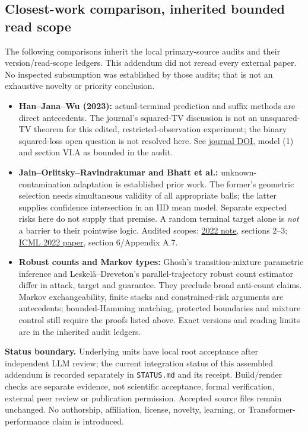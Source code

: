 \documentclass[10pt]{article}
\begin{document}
\subsection*{Closest-work comparison, inherited bounded read scope}
The following comparisons inherit the local primary-source audits and their version/read-scope ledgers. This addendum did not reread every external paper. No inspected subsumption was established by those audits; that is not an exhaustive novelty or priority conclusion.
\begin{itemize}
\item \textbf{Han--Jana--Wu (2023):} actual-terminal prediction and suffix methods are direct antecedents. The journal's squared-TV discussion is not an unsquared-TV theorem for this edited, restricted-observation experiment; the binary squared-loss open question is not resolved here. See \href{https://doi.org/10.1109/TIT.2023.3239508}{journal DOI}, model (1) and section VI.A as bounded in the audit.
\item \textbf{Jain--Orlitsky--Ravindrakumar and Bhatt et al.:} unknown-contamination adaptation is established prior work. The former's geometric selection needs simultaneous validity of all appropriate balls; the latter supplies confidence intersection in an IID mean model. Separate expected risks here do not supply that premise. A random terminal target alone is \emph{not} a barrier to their pointwise logic. Audited scopes: \href{https://arxiv.org/pdf/2202.05453v1}{2022 note}, sections 2--3; \href{https://proceedings.mlr.press/v162/bhatt22a/bhatt22a.pdf}{ICML 2022 paper}, section 6/Appendix A.7.
\item \textbf{Robust counts and Markov types:} Ghosh's transition-mixture parametric inference and Leskel\"a--Dreveton's parallel-trajectory robust count estimator differ in attack, target and guarantee. They preclude broad anti-count claims. Markov exchangeability, finite stacks and constrained-risk arguments are antecedents; bounded-Hamming matching, protected boundaries and mixture control still require the proofs listed above. Exact versions and reading limits are in the inherited audit ledgers.
\end{itemize}
\textbf{Status boundary.} Underlying units have local root acceptance after independent LLM review; the current integration status of this assembled addendum is recorded separately in \texttt{STATUS.md} and its receipt. Build/render checks are separate evidence, not scientific acceptance, formal verification, external peer review or publication permission. Accepted source files remain unchanged. No authorship, affiliation, license, novelty, learning, or Transformer-performance claim is introduced.
\end{document}
